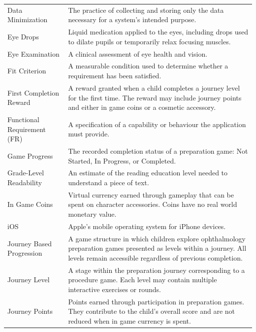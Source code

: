 \documentclass[12pt]{article}
\begin{document}
\begin{longtable}{@{}p{} p{}@{}}
Data Minimization &
The practice of collecting and storing only the data necessary for a system's intended purpose. \\

Eye Drops &
Liquid medication applied to the eyes, including drops used to dilate pupils or temporarily relax focusing muscles. \\

Eye Examination &
A clinical assessment of eye health and vision. \\

Fit Criterion &
A measurable condition used to determine whether a requirement has been satisfied. \\

First Completion Reward &
A reward granted when a child completes a journey level for the first time. The reward may include journey points and either in game coins or a cosmetic accessory. \\

Functional Requirement (FR) &
A specification of a capability or behaviour the application must provide. \\

Game Progress &
The recorded completion status of a preparation game: Not Started, In Progress, or Completed. \\

Grade-Level Readability &
An estimate of the reading education level needed to understand a piece of text. \\

In Game Coins &
Virtual currency earned through gameplay that can be spent on character accessories. Coins have no real world monetary value. \\

iOS &
Apple's mobile operating system for iPhone devices. \\

Journey Based Progression &
A game structure in which children explore ophthalmology preparation games presented as levels within a journey. All levels remain accessible regardless of previous completion. \\

Journey Level &
A stage within the preparation journey corresponding to a procedure game. Each level may contain multiple interactive exercises or rounds. \\

Journey Points &
Points earned through participation in preparation games. They contribute to the child's overall score and are not reduced when in game currency is spent. \\


\end{longtable}
\end{document}
